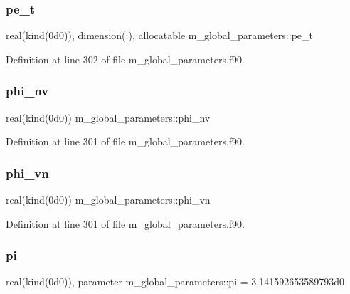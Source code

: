 \subsubsection{\texorpdfstring{pe\+\_\+t}{pe\_t}}
{\footnotesize\ttfamily real(kind(0d0)), dimension(\+:), allocatable m\+\_\+global\+\_\+parameters\+::pe\+\_\+t}



Definition at line 302 of file m\+\_\+global\+\_\+parameters.\+f90.

\mbox{\label{namespacem__global__parameters_a7dbd1ec1fd1ece4e997a825fa07785eb}} 
\subsubsection{\texorpdfstring{phi\+\_\+nv}{phi\_nv}}
{\footnotesize\ttfamily real(kind(0d0)) m\+\_\+global\+\_\+parameters\+::phi\+\_\+nv}



Definition at line 301 of file m\+\_\+global\+\_\+parameters.\+f90.

\mbox{\label{namespacem__global__parameters_acc6771df62005731bbec282b0c9a5659}} 
\subsubsection{\texorpdfstring{phi\+\_\+vn}{phi\_vn}}
{\footnotesize\ttfamily real(kind(0d0)) m\+\_\+global\+\_\+parameters\+::phi\+\_\+vn}



Definition at line 301 of file m\+\_\+global\+\_\+parameters.\+f90.

\mbox{\label{namespacem__global__parameters_a21765a90c01d221524670d1344b126cd}} 
\subsubsection{\texorpdfstring{pi}{pi}}
{\footnotesize\ttfamily real(kind(0d0)), parameter m\+\_\+global\+\_\+parameters\+::pi = 3.\+141592653589793d0}



